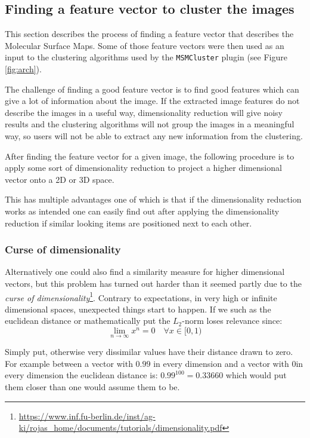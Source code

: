 \documentclass[journal]{vgtc}       %
\begin{document}
\subsection{Finding a feature vector to cluster the images}\label{sec:featurev}

This section describes the process of finding a feature vector that describes the  Molecular Surface Maps. Some of those feature vectors were then used as an input to the clustering algorithms used by the  \verb|MSMCluster| plugin (see  Figure \ref{fig:arch}).

The challenge of finding a good feature vector is to find good features which can give a lot of information about the image.
If the extracted image features do not describe the images in a useful way, dimensionality reduction will give noisy results and the clustering algorithms will not group the images in a meaningful way, so users will not be able to extract any new information from the clustering.

After finding the feature vector for a given image, the following procedure is to apply some sort of dimensionality reduction to project a higher dimensional vector onto a 2D or 3D space.

This has multiple advantages one of which is that if the dimensionality reduction works as intended one can easily find out after applying the dimensionality reduction if similar looking items are positioned next to each other.

\subsubsection{Curse of dimensionality}

Alternatively one could also find a similarity measure for higher dimensional vectors, but this problem has turned out harder than it seemed partly due to the \textit{curse of dimensionality}\mbox{\footnote{\url{https://www.inf.fu-berlin.de/inst/ag-ki/rojas_home/documents/tutorials/dimensionality.pdf}}}.
Contrary to expectations, in very high or infinite dimensional spaces, unexpected things start to happen. If we  such as the euclidean distance or mathematically put the \(L_2\)-norm loses relevance since:
\begin{equation}
\lim_{n\rightarrow \infty} x^n = 0 \quad \forall x \in [0,1)
\end{equation}

Simply put, otherwise very dissimilar values have their distance drawn to zero. For example between a vector with \(0.99\) in every dimension and a vector with \(0\)in every dimension the euclidean distance is: \(0.99^{100} = 0.33660\) which would put them closer than one would assume them to be.
\end{document}
